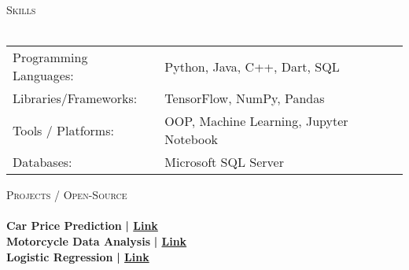 \documentclass[a4paper]{article}
\newcommand{\lineunder} {
    \vspace*{-8pt} \\
    \hspace*{-18pt} \hrulefill \\
}
\newcommand{\header} [1] {
    {\hspace*{-18pt}\vspace*{6pt} \textsc{#1}}
    \vspace*{-6pt} \lineunder
}
\begin{document}
%
%
  \header{Skills}
  \vspace{2mm}
  \begin{longtable}{p{4cm}p{12cm}}
  Programming Languages: & Python, Java, C++, Dart, SQL \\
  Libraries/Frameworks: & TensorFlow, NumPy, Pandas \\
  Tools / Platforms: & OOP, Machine Learning, Jupyter Notebook \\
  Databases: & Microsoft SQL Server \\
  \end{longtable}
  \vspace{1mm}

      \header{Projects / Open-Source}
      \vspace{2mm}
      {\textbf{Car Price Prediction}}\textbf{ | \href{https://github.com/MH0386/car\_price\_prediction}{Link}}\\

\vspace*{3mm}
      {\textbf{Motorcycle Data Analysis}}\textbf{ | \href{https://github.com/MH0386/motorcycle\_data\_analysis}{Link}}\\

\vspace*{3mm}
      {\textbf{Logistic Regression}}\textbf{ | \href{https://github.com/MH0386/logistic\_regression}{Link}}\\

\vspace*{3mm}
\end{document}
